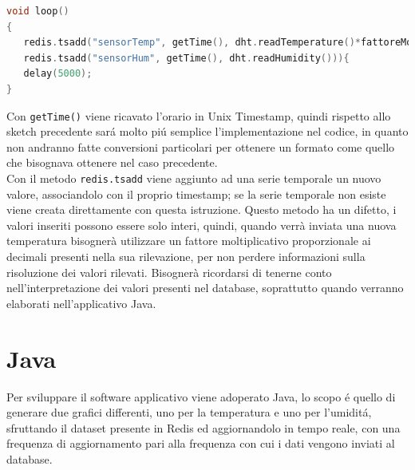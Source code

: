 \begin{enumerate}
\begin{lstlisting}[autogobble, style=c, language=C]
void loop()
{
   redis.tsadd("sensorTemp", getTime(), dht.readTemperature()*fattoreMoltiplicativoTemp))
   redis.tsadd("sensorHum", getTime(), dht.readHumidity())){
   delay(5000);
}\end{lstlisting}

    Con \texttt{getTime()} viene ricavato l'orario in Unix Timestamp, quindi rispetto allo sketch precedente
    sará molto piú semplice l'implementazione nel codice, in quanto non andranno fatte conversioni particolari per ottenere
    un formato come quello che bisognava ottenere nel caso precedente.\\
    Con il metodo \texttt{redis.tsadd} viene aggiunto ad una serie temporale un nuovo valore, associandolo con il proprio timestamp;
    se la serie temporale non esiste viene creata direttamente con questa istruzione.
    Questo metodo ha un difetto, i valori inseriti possono essere solo interi, quindi, quando verrà inviata
    una nuova temperatura bisognerà utilizzare un fattore moltiplicativo proporzionale ai decimali presenti nella sua rilevazione, per non perdere informazioni sulla
    risoluzione dei valori rilevati.
    Bisognerà ricordarsi di tenerne conto nell'interpretazione dei valori presenti nel database, soprattutto quando
    verranno elaborati nell'applicativo Java.
\end{enumerate}


\section{Java}
Per sviluppare il software applicativo viene adoperato Java, lo scopo é quello di generare due grafici differenti,
uno per la temperatura e uno per l'umiditá, sfruttando il dataset presente in Redis ed aggiornandolo in tempo reale, con
una frequenza di aggiornamento pari alla frequenza con cui i dati vengono inviati al database.

